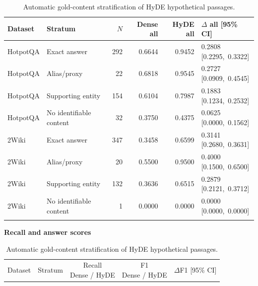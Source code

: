 \begin{table}[htbp]
\centering
\caption{Automatic gold-content stratification of HyDE hypothetical passages.}
\label{tab:hyde_gold_content_groups}
\footnotesize
\setlength{\tabcolsep}{3pt}
\renewcommand{\arraystretch}{1.08}

\begin{tabularx}{\textwidth}{@{}l>{\raggedright\arraybackslash}Xrrr>{\centering\arraybackslash}p{}@{}}
\toprule
Dataset & Stratum & $N$ & Dense all & HyDE all & $\Delta$ all [95\% CI] \\
\midrule
HotpotQA & Exact answer & 292 & 0.6644 & 0.9452 & \shortstack{0.2808\\\mbox{[0.2295, 0.3322]}} \\
\addlinespace[\jot]
HotpotQA & Alias/proxy & 22 & 0.6818 & 0.9545 & \shortstack{0.2727\\\mbox{[0.0909, 0.4545]}} \\
\addlinespace[\jot]
HotpotQA & Supporting entity & 154 & 0.6104 & 0.7987 & \shortstack{0.1883\\\mbox{[0.1234, 0.2532]}} \\
\addlinespace[\jot]
HotpotQA & No identifiable content & 32 & 0.3750 & 0.4375 & \shortstack{0.0625\\\mbox{[0.0000, 0.1562]}} \\
\addlinespace[\jot]
2Wiki & Exact answer & 347 & 0.3458 & 0.6599 & \shortstack{0.3141\\\mbox{[0.2680, 0.3631]}} \\
\addlinespace[\jot]
2Wiki & Alias/proxy & 20 & 0.5500 & 0.9500 & \shortstack{0.4000\\\mbox{[0.1500, 0.6500]}} \\
\addlinespace[\jot]
2Wiki & Supporting entity & 132 & 0.3636 & 0.6515 & \shortstack{0.2879\\\mbox{[0.2121, 0.3712]}} \\
\addlinespace[\jot]
2Wiki & No identifiable content & 1 & 0.0000 & 0.0000 & \shortstack{0.0000\\\mbox{[0.0000, 0.0000]}} \\
\addlinespace[\jot]
\bottomrule
\end{tabularx}
\medskip\textbf{Recall and answer scores}\par\smallskip
\begin{tabularx}{\textwidth}{@{}l>{\raggedright\arraybackslash}Xccc@{}}
\toprule
Dataset & Stratum & \shortstack{Recall\\Dense / HyDE} & \shortstack{F1\\Dense / HyDE} & $\Delta$F1 [95\% CI] \\

\end{tabularx}
\end{table}

